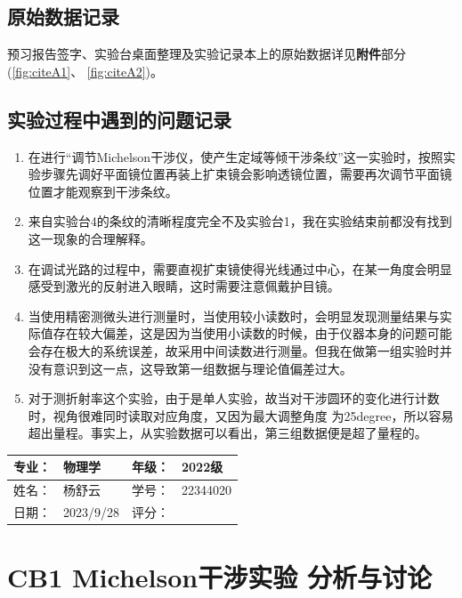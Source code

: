 \documentclass[dvipsnames, svgnames,a4paper,11pt]{article}
\begin{document}
	\clearpage
	\subsection{原始数据记录}
	预习报告签字、实验台桌面整理及实验记录本上的原始数据详见\textbf{附件}部分(\cref{fig:citeA1}、 \cref{fig:citeA2})。
	
	\subsection{实验过程中遇到的问题记录}
	\begin{enumerate}
		\item 在进行“调节Michelson干涉仪，使产生定域等倾干涉条纹”这一实验时，按照实验步骤先调好平面镜位置再装上扩束镜会影响透镜位置，需要再次调节平面镜位置才能观察到干涉条纹。
		\item 来自实验台4的条纹的清晰程度完全不及实验台1，我在实验结束前都没有找到这一现象的合理解释。
		\item 在调试光路的过程中，需要直视扩束镜使得光线通过中心，在某一角度会明显感受到激光的反射进入眼睛，这时需要注意佩戴护目镜。
		\item 当使用精密测微头进行测量时，当使用较小读数时，会明显发现测量结果与实际值存在较大偏差，这是因为当使用小读数的时候，由于仪器本身的问题可能会存在极大的系统误差，故采用中间读数进行测量。但我在做第一组实验时并没有意识到这一点，这导致第一组数据与理论值偏差过大。
		\item 对于测折射率这个实验，由于是单人实验，故当对干涉圆环的变化进行计数时，视角很难同时读取对应角度，又因为最大调整角度
		为25degree，所以容易超出量程。事实上，从实验数据可以看出，第三组数据便是超了量程的。
	\end{enumerate}
	
	
	
	\clearpage
	\begin{table}
		\renewcommand\arraystretch{1.7}
		\begin{tabularx}{\textwidth}{|X|X|X|X|}
			\hline
			专业：& 物理学 &年级：& 2022级\\
			\hline
			姓名： & 杨舒云 & 学号：& 22344020\\
			\hline
			日期：& 2023/9/28 & 评分： &\\
			\hline
		\end{tabularx}
	\end{table}
	
	\section{CB1 Michelson干涉实验 \quad\heiti 分析与讨论}
\end{document}
